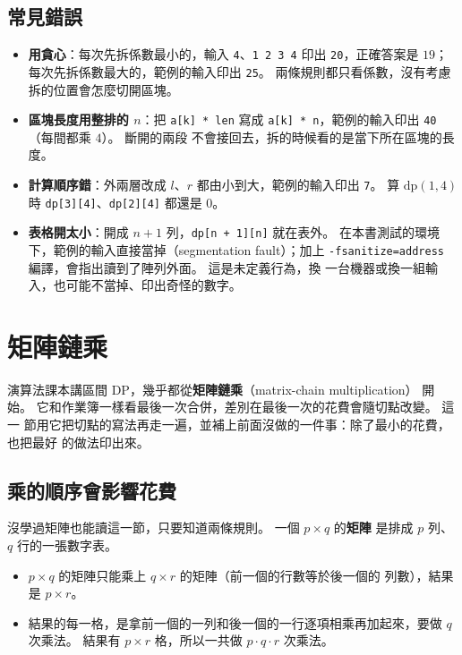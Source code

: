 \subsection{常見錯誤}

\begin{itemize}
\item \textbf{用貪心}：每次先拆係數最小的，輸入 \texttt{4}、\texttt{1 2 3 4}
印出 \texttt{20}，正確答案是 $19$；每次先拆係數最大的，範例的輸入印出
\texttt{25}。 兩條規則都只看係數，沒有考慮拆的位置會怎麼切開區塊。
\item \textbf{區塊長度用整排的 $n$}：把 \texttt{a[k] * len} 寫成
\texttt{a[k] * n}，範例的輸入印出 \texttt{40}（每間都乘 $4$）。 斷開的兩段
不會接回去，拆的時候看的是當下所在區塊的長度。
\item \textbf{計算順序錯}：外兩層改成 $l$、$r$ 都由小到大，範例的輸入印出
\texttt{7}。 算 $\mathrm{dp}(1, 4)$ 時 \texttt{dp[3][4]}、\texttt{dp[2][4]}
都還是 $0$。
\item \textbf{表格開太小}：開成 $n + 1$ 列，\texttt{dp[n + 1][n]} 就在表外。
在本書測試的環境下，範例的輸入直接當掉（segmentation fault）；加上
\texttt{-fsanitize=address} 編譯，會指出讀到了陣列外面。 這是未定義行為，換
一台機器或換一組輸入，也可能不當掉、印出奇怪的數字。
\end{itemize}

\section{矩陣鏈乘}
\label{sec:ivdp-matrix}

演算法課本講區間 DP，幾乎都從\textbf{矩陣鏈乘}（matrix-chain multiplication）
開始。 它和作業簿一樣看最後一次合併，差別在最後一次的花費會隨切點改變。 這一
節用它把切點的寫法再走一遍，並補上前面沒做的一件事：除了最小的花費，也把最好
的做法印出來。

\subsection{乘的順序會影響花費}

沒學過矩陣也能讀這一節，只要知道兩條規則。 一個 $p \times q$ 的\textbf{矩陣}
是排成 $p$ 列、$q$ 行的一張數字表。

\begin{itemize}
\item $p \times q$ 的矩陣只能乘上 $q \times r$ 的矩陣（前一個的行數等於後一個的
列數），結果是 $p \times r$。
\item 結果的每一格，是拿前一個的一列和後一個的一行逐項相乘再加起來，要做 $q$
次乘法。 結果有 $p \times r$ 格，所以一共做 $p \cdot q \cdot r$ 次乘法。
\end{itemize}

